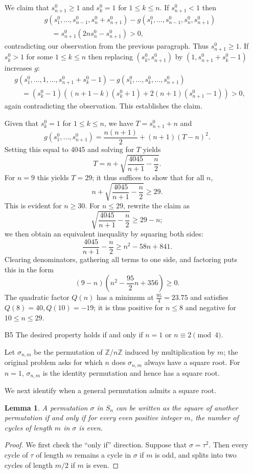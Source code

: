 \documentclass[amssymb,twocolumn,pra,10pt,aps]{revtex4-1}
\newtheorem{lemma}{Lemma}
\newcommand{\ZZ}{\mathbb{Z}}
\begin{document}
\begin{itemize}
We claim that $s_{n+1}^0 \geq 1$ and $s_k^0 = 1$ for $1\leq k\leq n$. If $s_{n+1}^0<1$ then
\begin{align*}
& g(s_1^0,\ldots,s_{n-1}^0,s_n^0+s_{n+1}^0)-g(s_1^0,\ldots,s_{n-1}^0,s_n^0,s_{n+1}^0) \\
&\quad = s_{n+1}^0(2ns_n^0-s_{n+1}^0) > 0,
\end{align*}
contradicting our observation from the previous paragraph. Thus $s_{n+1}^0 \geq 1$. If $s_k^0>1$ for some $1\leq k\leq n$ then replacing $(s_k^0,s_{n+1}^0)$ by $(1,s_{n+1}^0+s_k^0-1)$ increases $g$:
\begin{align*}
&g(s_1^0,\ldots,1,\ldots,s_{n+1}^0+s_k^0-1)-g(s_1^0,\ldots,s_k^0,\ldots,s_{n+1}^0) \\
&\quad= (s_k^0-1)((n+1-k)(s_k^0+1)+2(n+1)(s_{n+1}^0-1)) > 0,
\end{align*}
again contradicting the observation. This establishes the claim.

Given that $s_k^0 = 1$ for $1 \leq k \leq n$, we have
$T = s_{n+1}^0 + n$ and
\[
g(s_1^0,\dots,s_{n+1}^0) = \frac{n(n+1)}{2} + (n+1)(T-n)^2.
\]
Setting this equal to 4045 and solving for $T$ yields
\[
T = n+\sqrt{\frac{4045}{n+1} - \frac{n}{2}}.
\]
For $n=9$ this yields $T = 29$; it thus suffices to show that for all $n$, 
\[
n+\sqrt{\frac{4045}{n+1} - \frac{n}{2}} \geq 29.
\]
This is evident for $n \geq 30$. For $n \leq 29$, rewrite the claim as
\[
\sqrt{\frac{4045}{n+1} - \frac{n}{2}} \geq 29-n;
\]
we then obtain an equivalent inequality by squaring both sides:
\[
\frac{4045}{n+1} - \frac{n}{2} \geq n^2-58n+841.
\]
Clearing denominators, gathering all terms to one side, and factoring puts this in the form
\[
(9-n)(n^2 - \frac{95}{2} n + 356) \geq 0.
\]
The quadratic factor $Q(n)$ has a minimum at $\frac{95}{4} = 23.75$
and satisfies $Q(8) = 40, Q(10) = -19$; it is thus positive for $n \leq 8$ and negative for $10 \leq n \leq 29$.

\item[B5]
The desired property holds if and only if $n = 1$ or $n \equiv 2 \pmod{4}$.

Let $\sigma_{n,m}$ be the permutation of $\ZZ/n\ZZ$ induced by multiplication by $m$; the original problem asks for which $n$ does $\sigma_{n,m}$ always have a square root. For $n=1$, $\sigma_{n,m}$ is the identity permutation and hence has a square root.

We next identify when a general permutation admits a square root.

\begin{lemma} \label{lem:2023B5-2}
A permutation $\sigma$ in $S_n$ can be written as the square of another permutation if and only if for every even positive integer $m$, the number of cycles of length $m$ in $\sigma$ is even.
\end{lemma}
\begin{proof}
We first check the ``only if'' direction. Suppose that $\sigma = \tau^2$. Then every cycle of $\tau$ of length $m$ remains a cycle in $\sigma$ if $m$ is odd, and splits into two cycles of length $m/2$ if $m$ is even.


\end{proof}
\end{itemize}
\end{document}

